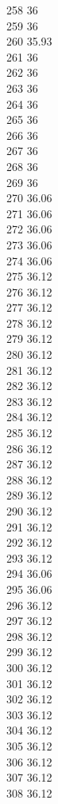 258	36\\
259	36\\
260	35.93\\
261	36\\
262	36\\
263	36\\
264	36\\
265	36\\
266	36\\
267	36\\
268	36\\
269	36\\
270	36.06\\
271	36.06\\
272	36.06\\
273	36.06\\
274	36.06\\
275	36.12\\
276	36.12\\
277	36.12\\
278	36.12\\
279	36.12\\
280	36.12\\
281	36.12\\
282	36.12\\
283	36.12\\
284	36.12\\
285	36.12\\
286	36.12\\
287	36.12\\
288	36.12\\
289	36.12\\
290	36.12\\
291	36.12\\
292	36.12\\
293	36.12\\
294	36.06\\
295	36.06\\
296	36.12\\
297	36.12\\
298	36.12\\
299	36.12\\
300	36.12\\
301	36.12\\
302	36.12\\
303	36.12\\
304	36.12\\
305	36.12\\
306	36.12\\
307	36.12\\
308	36.12\\
